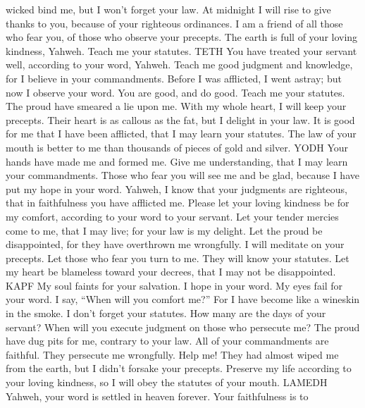 wicked bind me, but I won't forget your law.  At midnight I
will rise to give thanks to you, because of your righteous ordinances.
 I am a friend of all those who fear you, of those who
observe your precepts.  The earth is full of your loving
kindness, Yahweh. Teach me your statutes. TETH  You have
treated your servant well, according to your word, Yahweh. 
Teach me good judgment and knowledge, for I believe in your
commandments.  Before I was afflicted, I went astray; but
now I observe your word.  You are good, and do good. Teach
me your statutes.  The proud have smeared a lie upon me.
With my whole heart, I will keep your precepts.  Their
heart is as callous as the fat, but I delight in your law. 
It is good for me that I have been afflicted, that I may learn your
statutes.  The law of your mouth is better to me than
thousands of pieces of gold and silver. YODH  Your hands
have made me and formed me. Give me understanding, that I may learn your
commandments.  Those who fear you will see me and be glad,
because I have put my hope in your word.  Yahweh, I know
that your judgments are righteous, that in faithfulness you have
afflicted me.  Please let your loving kindness be for my
comfort, according to your word to your servant.  Let your
tender mercies come to me, that I may live; for your law is my delight.
 Let the proud be disappointed, for they have overthrown me
wrongfully. I will meditate on your precepts.  Let those
who fear you turn to me. They will know your statutes.  Let
my heart be blameless toward your decrees, that I may not be
disappointed. KAPF  My soul faints for your salvation. I
hope in your word.  My eyes fail for your word. I say,
``When will you comfort me?''  For I have become like a
wineskin in the smoke. I don't forget your statutes.  How
many are the days of your servant? When will you execute judgment on
those who persecute me?  The proud have dug pits for me,
contrary to your law.  All of your commandments are
faithful. They persecute me wrongfully. Help me!  They had
almost wiped me from the earth, but I didn't forsake your precepts.
 Preserve my life according to your loving kindness, so I
will obey the statutes of your mouth. LAMEDH  Yahweh, your
word is settled in heaven forever.  Your faithfulness is to

